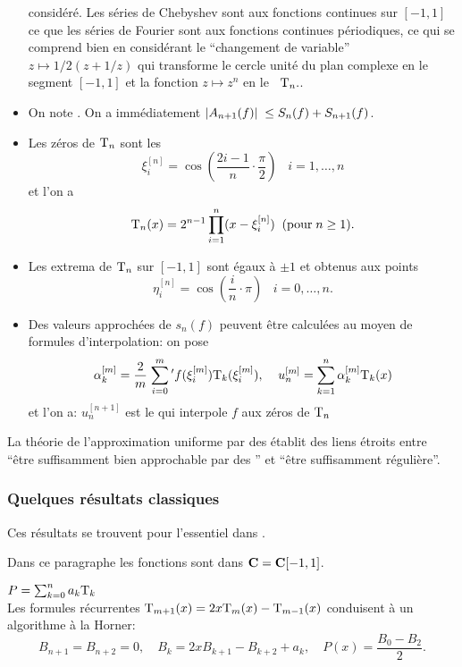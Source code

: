 \begin{fnotation}
\begin{itemize}
{{considéré.  Les séries de Chebyshev sont aux fonctions continues sur  
$[-1,1]$  ce que les séries de Fourier sont aux fonctions continues 
périodiques, ce qui se comprend bien en considérant le ``changement de 
variable''  $z\mapsto 1/2(z + 1/z)$   qui transforme le cercle unité du plan complexe en le segment   $[-1,1]$  et la fonction  $z\mapsto z^n$  en le \pol~${\rm T}_n.$}}. 
\item  
On note  .        
On a immédiatement   $\left|{ A_{n+1}(f) }\right|\;  \leq S_n(f) + S_{n+1}(f)$. 
\item  
Les  zéros de  ${\rm T}_n$   sont les 
\[
\xi_i^{[n]} = \cos \left(\frac{2i-1} {n}\cdot \frac {\pi} {2}\right) \; \; \; i =1,\ldots,n
\]
et l'on a  
\[
{\rm T}_n(x) = 2^{n-1} \prod_{i=1}^{n} (x - \xi_i^{[n]}) \; \; (  
\hbox{pour}\; n \geq 1).
\]          
\item  
Les  extrema de  ${\rm T}_n$  sur  $[-1,1]$  sont égaux à $\pm 1$ et obtenus aux points
\[
\eta_i^{[n]} = \cos \left(\frac{i} {n}\cdot \pi\right) \; \; \; i=0,\ldots,n.
\] 
\item  
Des valeurs approchées de  $s_n(f)$ peuvent être calculées au moyen de 
formules d'interpolation:  on pose   
\[
\alpha_k^{[m]} = \frac {2} {m} \;
{\sum_{i=0}^m}\,'f(\xi_i^{[m]}){\rm T}_k(\xi_i^{[m]}), \; \; \; \; u_n^{[m]} = 
\sum_{k=1}^{n} \alpha_k^{[m]}{\rm T}_k(x)
\]
et l'on a:  $u_n^{[n+1]}$   est le \pol qui interpole $f$ aux zéros de  
${\rm T}_{n}$
\end{itemize}
\end{fnotation}
La théorie de l'approximation uniforme par des \pols établit des liens 
étroits entre ``être suffisamment bien approchable par des \pols''  et  
``être suffisamment régulière''.


\subsubsection{Quelques résultats classiques}\label{fsubsubsec 522}

Ces résultats se trouvent pour l'essentiel dans \cite{fCh}.

\smallskip  Dans ce paragraphe les fonctions sont dans ${\bf C}={{\bf C}[-1,1]}$.

\smallskip {} $P=\sum_{k=0}^{n}a_k{\rm T}_k$\\
 Les formules récurrentes  ${\rm T}_{m+1}(x) = 2x{\rm T}_m(x) - {\rm T}_{m-1}(x)$  conduisent à un algorithme à la Horner:
\[
B_{n+1} = B_{n+2} = 0, \quad  B_k = 2xB_{k+1} - B_{k+2} + a_k, \quad  P(x) = \frac 
{B_0 - B_2} {2}.
\]

